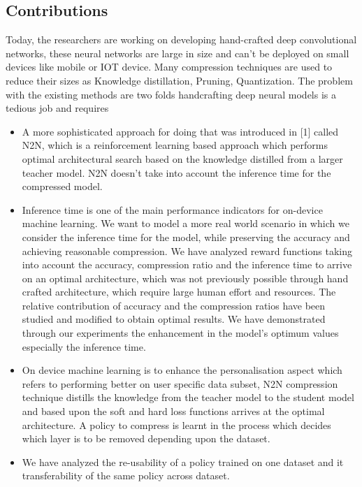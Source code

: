\documentclass[../main]{subfiles}
\begin{document}
    \subsection{Contributions}
        Today, the researchers are working on developing hand-crafted deep convolutional networks, these neural networks are large in size and can’t be deployed on small devices like mobile or IOT device.
        Many compression techniques are used to reduce their sizes as Knowledge distillation, Pruning, Quantization.
        The problem with the existing methods are two folds handcrafting deep neural models is a tedious job and requires 
        \begin{itemize}
            \item A more sophisticated approach for doing that was introduced in [1] called N2N, which is a reinforcement learning based approach which performs optimal architectural search based on the knowledge distilled from a larger teacher model.
            N2N doesn't take into account the inference time for the compressed model.
            \item Inference time is one of the main performance indicators for on-device machine learning.
            We want to model a more real world scenario in which we consider the inference time for the model, while preserving the accuracy and achieving reasonable compression.
            We have analyzed  reward functions taking into account the accuracy, compression ratio and the inference time to arrive on an optimal architecture, which was not previously possible through hand crafted architecture, which require large human effort and resources.
            The relative contribution of accuracy and the compression ratios have been studied and modified to obtain optimal results.
            We have demonstrated through our experiments the enhancement in the model’s optimum values especially the inference time.
            \item On device machine learning is to enhance the personalisation aspect which refers to performing better on user specific data subset,  N2N compression technique distills the knowledge from the teacher model to the student model and based upon the soft and hard loss functions arrives at the optimal architecture.
            A policy to compress is learnt in the process which decides which layer is to be removed depending upon the dataset.
            \item We have analyzed the re-usability of a policy trained on one dataset and it transferability of the same policy across dataset.

\end{itemize}
\end{document}
